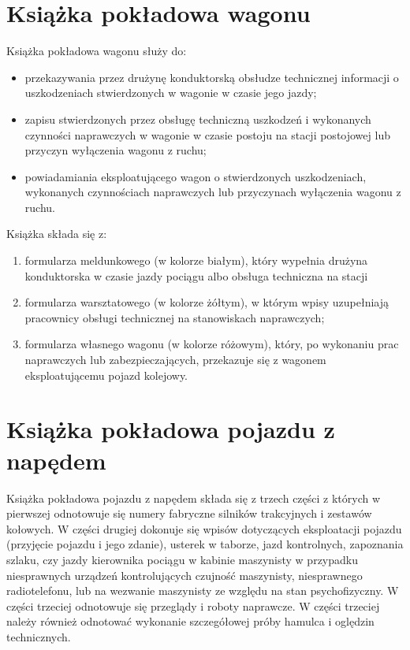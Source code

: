 \section{Książka pokładowa wagonu}
Książka pokładowa wagonu służy do:
\begin{itemize}
\item przekazywania przez drużynę konduktorską obsłudze technicznej informacji o uszkodzeniach stwierdzonych w wagonie w czasie jego jazdy;
\item zapisu stwierdzonych przez obsługę techniczną uszkodzeń i wykonanych czynności naprawczych w wagonie w czasie postoju na stacji postojowej lub przyczyn wyłączenia wagonu z ruchu;
\item powiadamiania eksploatującego wagon o stwierdzonych uszkodzeniach, wykonanych czynnościach naprawczych lub przyczynach wyłączenia wagonu z ruchu.
\end{itemize}
Książka składa się z:
\begin{enumerate}
\item formularza meldunkowego (w kolorze białym), który wypełnia drużyna konduktorska w czasie jazdy pociągu albo obsługa techniczna na stacji \item formularza warsztatowego (w kolorze żółtym), w którym wpisy uzupełniają pracownicy obsługi technicznej na stanowiskach naprawczych;
\item formularza własnego wagonu (w kolorze różowym), który, po wykonaniu prac naprawczych lub zabezpieczających, przekazuje się z wagonem eksploatującemu pojazd kolejowy.
\end{enumerate}

\section{Książka pokładowa pojazdu z napędem}

Książka pokładowa pojazdu z napędem składa się z trzech części z których w pierwszej odnotowuje się numery fabryczne silników trakcyjnych i zestawów kołowych. W części drugiej dokonuje się wpisów dotyczących eksploatacji pojazdu (przyjęcie pojazdu i jego zdanie), usterek w taborze, jazd kontrolnych, zapoznania szlaku, czy jazdy kierownika pociągu w kabinie maszynisty w przypadku niesprawnych urządzeń kontrolujących czujność maszynisty, niesprawnego radiotelefonu, lub na wezwanie maszynisty ze względu na stan psychofizyczny. W części trzeciej odnotowuje się przeglądy i roboty naprawcze. W części trzeciej należy również odnotować wykonanie szczegółowej próby hamulca i oględzin technicznych.

